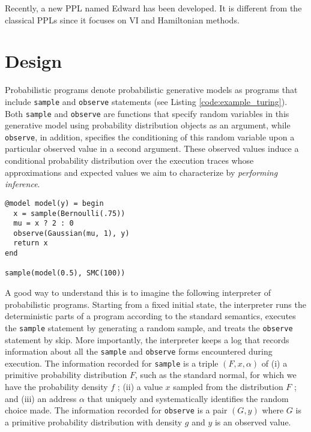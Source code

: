 Recently, a new \gls{PPL} named Edward \cite{Edward} has been developed. It is different from the classical \glspl{PPL} since it focuses on \gls{VI} and Hamiltonian methods.


\section{Design}

Probabilistic programs denote probabilistic generative models as programs that include \texttt{sample} and \texttt{observe} statements (see Listing \ref{code:example_turing}). Both \texttt{sample} and \texttt{observe} are functions that specify random variables in this generative model using probability distribution objects as an argument, while \texttt{observe}, in addition, specifies the conditioning of this random variable upon a particular observed value in a second argument. These observed values induce a conditional probability distribution over the execution traces whose approximations and expected values we aim to characterize by \textit{performing inference}. \\

\begin{lstlisting}[caption={Example of a Turing model},captionpos=b,label=code:example_turing]
@model model(y) = begin
  x = sample(Bernoulli(.75))
  mu = x ? 2 : 0
  observe(Gaussian(mu, 1), y)
  return x
end

sample(model(0.5), SMC(100))
\end{lstlisting}

A good way to understand this is to imagine the following interpreter of probabilistic programs. Starting from a fixed initial state, the interpreter runs the deterministic parts of a program according to the standard semantics, executes the \texttt{sample} statement by generating a random sample, and treats the \texttt{observe} statement by skip. More importantly, the interpreter keeps a log that records information about all the \texttt{sample} and \texttt{observe} forms encountered during execution. The information recorded for \texttt{sample} is a triple $(F, x, \alpha)$ of (i) a primitive probability distribution $F$, such as the standard normal, for which we have the probability density $f$ ; (ii) a value $x$ sampled from the distribution $F$ ; and (iii) an address $\alpha$ that uniquely and systematically identifies the random choice made. The information recorded for \texttt{observe} is a pair $(G,y)$ where $G$ is a primitive probability distribution with density $g$ and $y$ is an observed value.

